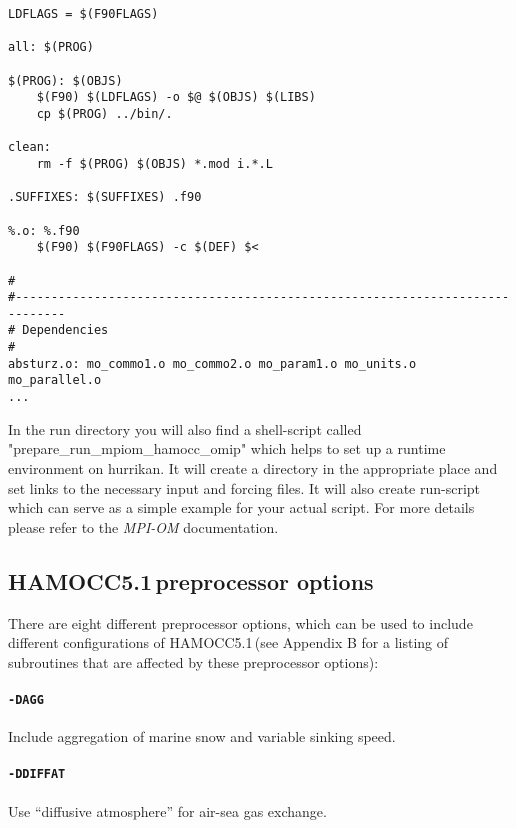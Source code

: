 \documentclass[11pt,a4paper,fleqn,twoside]{article}
\newcommand{\ham}{HAMOCC5.1\,}
\begin{document}
\begin{footnotesize}
\begin{verbatim}
LDFLAGS = $(F90FLAGS)

all: $(PROG)

$(PROG): $(OBJS)
	$(F90) $(LDFLAGS) -o $@ $(OBJS) $(LIBS)
	cp $(PROG) ../bin/.

clean:
	rm -f $(PROG) $(OBJS) *.mod i.*.L

.SUFFIXES: $(SUFFIXES) .f90

%.o: %.f90
	$(F90) $(F90FLAGS) -c $(DEF) $<	

#
#-----------------------------------------------------------------------------
# Dependencies
#
absturz.o: mo_commo1.o mo_commo2.o mo_param1.o mo_units.o mo_parallel.o
...
\end{verbatim}
\end{footnotesize}

In the run directory you will also find a shell-script called "prepare\_run\_mpiom\_hamocc\_omip" which helps to set up
a runtime environment on hurrikan. It will create a directory in the appropriate place and 
set links to the necessary input and forcing files. It will also create run-script 
which can serve as a simple example for your actual script. 
For more details please refer to the {\em MPI-OM} documentation.

\subsection{\label{preprocessor_options}\ham preprocessor options}

There are eight different preprocessor options, which can be used to include
different configurations of \ham (see Appendix B for a listing of subroutines
that are affected by these preprocessor options):

\paragraph{\tt -DAGG} Include aggregation of marine snow and variable sinking
speed. 


\paragraph{\tt -DDIFFAT} Use ``diffusive atmosphere'' for air-sea gas exchange.
\end{document}
